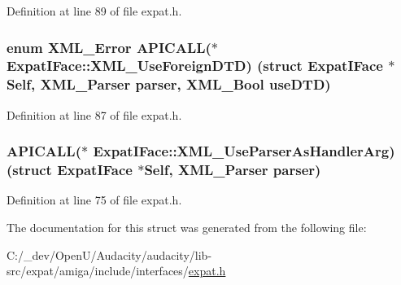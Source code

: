 Definition at line 89 of file expat.\+h.

\subsubsection[{\texorpdfstring{X\+M\+L\+\_\+\+Use\+Foreign\+D\+TD}{XML_UseForeignDTD}}]{\setlength{\rightskip}{0pt plus 5cm}enum {\bf X\+M\+L\+\_\+\+Error} A\+P\+I\+C\+A\+LL($\ast$ Expat\+I\+Face\+::\+X\+M\+L\+\_\+\+Use\+Foreign\+D\+TD) (struct {\bf Expat\+I\+Face} $\ast$Self, {\bf X\+M\+L\+\_\+\+Parser} parser, {\bf X\+M\+L\+\_\+\+Bool} use\+D\+TD)}\hypertarget{struct_expat_i_face_a3b2b7f000d7250ac97ebd5075e5d6c53}{}\label{struct_expat_i_face_a3b2b7f000d7250ac97ebd5075e5d6c53}


Definition at line 87 of file expat.\+h.

\subsubsection[{\texorpdfstring{X\+M\+L\+\_\+\+Use\+Parser\+As\+Handler\+Arg}{XML_UseParserAsHandlerArg}}]{ A\+P\+I\+C\+A\+LL($\ast$ Expat\+I\+Face\+::\+X\+M\+L\+\_\+\+Use\+Parser\+As\+Handler\+Arg) (struct {\bf Expat\+I\+Face} $\ast$Self, {\bf X\+M\+L\+\_\+\+Parser} parser)}\hypertarget{struct_expat_i_face_a7221d53ff72a90d46ae221b1b741b944}{}\label{struct_expat_i_face_a7221d53ff72a90d46ae221b1b741b944}


Definition at line 75 of file expat.\+h.



The documentation for this struct was generated from the following file\+:\begin{DoxyCompactItemize}
\item 
C\+:/\+\_\+dev/\+Open\+U/\+Audacity/audacity/lib-\/src/expat/amiga/include/interfaces/\hyperlink{amiga_2include_2interfaces_2expat_8h}{expat.\+h}\end{DoxyCompactItemize}
